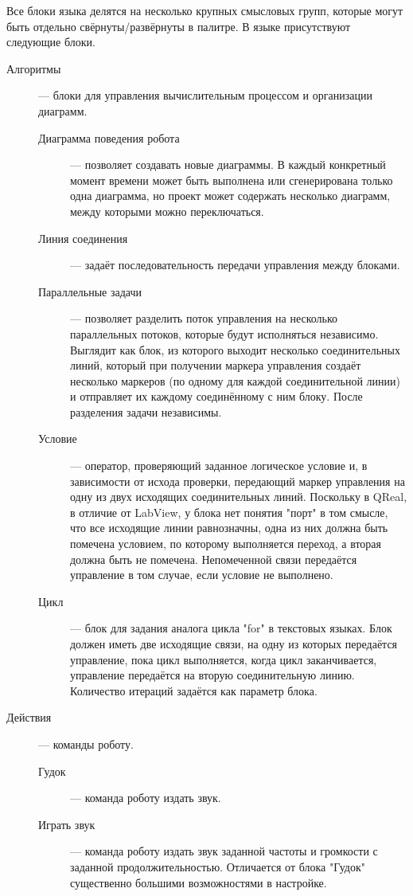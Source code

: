 \documentclass[a4paper]{article}
\begin{document}
Все блоки языка делятся на несколько крупных смысловых групп, которые могут быть отдельно свёрнуты/развёрнуты в палитре. В языке присутствуют следующие блоки.
\begin{description}
	\item[Алгоритмы] --- блоки для управления вычислительным процессом и организации диаграмм.
  \begin{description}
    \item[Диаграмма поведения робота] --- позволяет создавать новые диаграммы. В каждый конкретный момент времени может быть выполнена или сгенерирована только одна диаграмма, но проект может содержать несколько диаграмм, между которыми можно переключаться.
    \item[Линия соединения] --- задаёт последовательность передачи управления между блоками.
    \item[Параллельные задачи] --- позволяет разделить поток управления на несколько параллельных потоков, которые будут исполняться независимо. Выглядит как блок, из которого выходит несколько соединительных линий, который при получении маркера управления создаёт несколько маркеров (по одному для каждой соединительной линии) и отправляет их каждому соединённому с ним блоку. После разделения задачи независимы.
    \item[Условие] --- оператор, проверяющий заданное логическое условие и, в зависимости от исхода проверки, передающий маркер управления на одну из двух исходящих соединительных линий. Поскольку в QReal, в отличие от LabView, у блока нет понятия "порт" в том смысле, что все исходящие линии равнозначны, одна из них должна быть помечена условием, по которому выполняется переход, а вторая должна быть не помечена. Непомеченной связи передаётся управление в том случае, если условие не выполнено.
    \item[Цикл] --- блок для задания аналога цикла "for" в текстовых языках. Блок должен иметь две исходящие связи, на одну из которых передаётся управление, пока цикл выполняется, когда цикл заканчивается, управление передаётся на вторую соединительную линию. Количество итераций задаётся как параметр блока.
  \end{description}
  \item[Действия] --- команды роботу.
  \begin{description}
    \item[Гудок] --- команда роботу издать звук.
    \item[Играть звук] --- команда роботу издать звук заданной частоты и громкости с заданной продолжительностью. Отличается от блока "Гудок" существенно большими возможностями в настройке.

\end{description}
\end{description}
\end{document}
